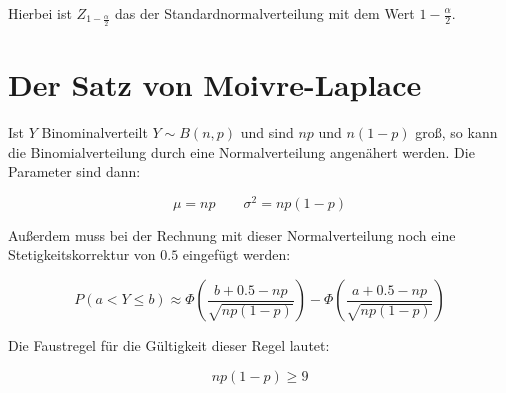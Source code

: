 Hierbei ist $Z_{1-\frac{\alpha}{2}}$ das  der
Standardnormalverteilung mit dem Wert $1-\frac{\alpha}{2}$.

\section{Der Satz von Moivre-Laplace}

Ist $Y$ Binominalverteilt $Y \sim B(n,p)$ und sind $np$ und $n(1-p)$ groß, so kann die Binomialverteilung durch eine Normalverteilung angenähert werden.
Die Parameter sind dann:

\[\mu = np \qquad \sigma^2=np(1-p)\]

Außerdem muss bei der Rechnung mit dieser Normalverteilung noch eine Stetigkeitskorrektur von $0.5$ eingefügt werden:

\[P(a < Y \le b) \approx 
  \Phi\left(\frac{b+\mathbf{0.5}-np}{\sqrt{np(1-p)}}\right) -
  \Phi\left(\frac{a+\mathbf{0.5}-np}{\sqrt{np(1-p)}}\right)\]

Die Faustregel für die Gültigkeit dieser Regel lautet:

\[np(1-p) \ge 9\]

